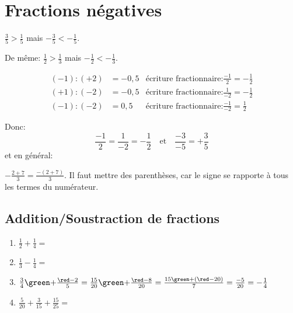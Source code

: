  
\section{Fractions négatives}
$\frac{3}{5} > \frac{1}{5}$ mais $-\frac{3}{5} < -\frac{1}{5}$.

De même: $\frac{1}{2} > \frac{1}{3}$ mais $-\frac{1}{2} < -\frac{1}{3}$.



$$\begin{array}{rlr}
 (-1):(+2) &=-0,5 &\text{écriture fractionnaire:} \frac{-1}{2}=-\frac{1}{2} \\
 (+1):(-2) &=-0,5 &\text{écriture fractionnaire:} \frac{1}{-2}=-\frac{1}{2} \\
 (-1):(-2) &=0,5  &\text{écriture fractionnaire:} \boxed{\frac{-1}{-2}=\frac{1}{2}}
\end{array}$$

Donc: 
$$ \boxed{\frac{-1}{2}=\frac{1}{-2} =-\frac{1}{2}} \quad \text{et} \quad \boxed{\frac{-3}{-5}=+\frac{3}{5}} $$
et en général:

\attention $-\frac{2+7}{3} = \frac{-(2+7)}{3}$. Il faut mettre des parenthèses, car le signe se rapporte à tous les termes du numérateur.





\subsection{Addition/Soustraction de fractions}
\begin{enumerate}[label=\alph*)]
  \item $ \frac{1}{2}+\frac{1}{4} = $
  \item $ \frac{1}{3}-\frac{1}{4}= $
  \item $ \frac{3}{4} {\green +} \frac{{\red -}2}{5} =  \frac{15}{20} {\green +} \frac{{\red -}8}{20} = \frac{15{\green +}({\red -}20)}{7} = \frac{-5}{20} = -\frac{1}{4} $ 
  \item $ \frac{5}{20} + \frac{3}{15} +\frac{15}{25}= $
\end{enumerate}




